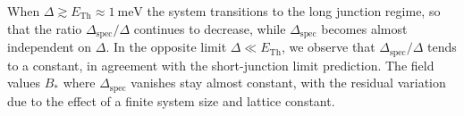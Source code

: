 When $\Delta \gtrsim E_\mathrm{Th}\approx \SI{1}{\meV}$ the system transitions to the long junction regime, so that the ratio $\Delta_\textrm{spec}/\Delta$ continues to decrease, while $\Delta_\text{spec}$ becomes almost independent on $\Delta$.
In the opposite limit $\Delta \ll E_\mathrm{Th}$, we observe that $\Delta_\textrm{spec}/\Delta$ tends to a constant, in agreement with the short-junction limit prediction.
The field values $B_*$ where $\Delta_\textrm{spec}$ vanishes stay almost constant, with the residual variation due to the effect of a finite system size and lattice constant.


